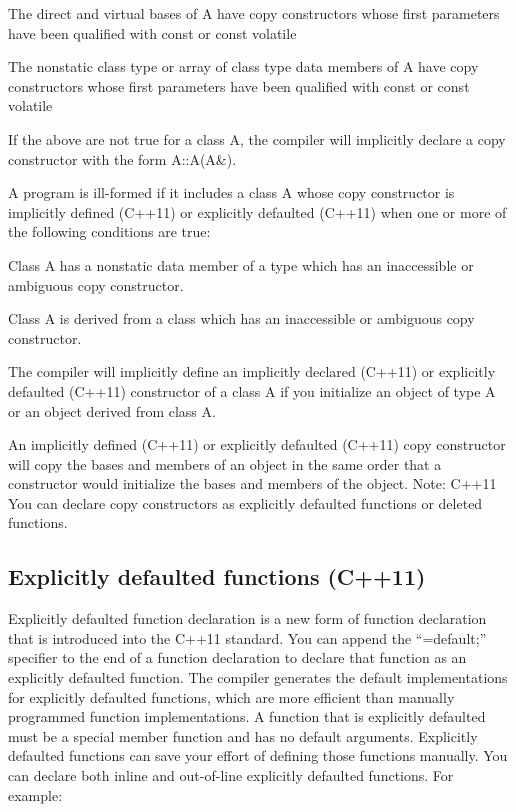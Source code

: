 \documentclass{book}
\begin{document}
    The direct and virtual bases of A have copy constructors whose first parameters have been qualified with const or const volatile

    The nonstatic class type or array of class type data members of A have copy constructors whose first parameters have been qualified with const or const volatile

If the above are not true for a class A, the compiler will implicitly declare a copy constructor with the form A::A(A\&).

A program is ill-formed if it includes a class A whose copy constructor is implicitly defined (C++11) or explicitly defaulted (C++11) when one or more of the following conditions are true:

    Class A has a nonstatic data member of a type which has an inaccessible or ambiguous copy constructor.

    Class A is derived from a class which has an inaccessible or ambiguous copy constructor.

The compiler will implicitly define an implicitly declared (C++11) or explicitly defaulted (C++11) constructor of a class A if you initialize an object of type A or an object derived from class A.

An implicitly defined (C++11) or explicitly defaulted (C++11) copy constructor will copy the bases and members of an object in the same order that a constructor would 
initialize the bases and members of the object.
Note: C++11 You can declare copy constructors as explicitly defaulted functions or deleted functions.

\subsection{Explicitly defaulted functions (C++11)}
Explicitly defaulted function declaration is a new form of function declaration that is introduced into the C++11 standard. 
You can append the ``=default;'' specifier to the end of a function declaration to declare that function as an explicitly defaulted function. 
The compiler generates the default implementations for explicitly defaulted functions, which are more efficient than manually programmed function implementations.
A function that is explicitly defaulted must be a special member function and has no default arguments.
Explicitly defaulted functions can save your effort of defining those functions manually.
You can declare both inline and out-of-line explicitly defaulted functions. For example:
\end{document}
